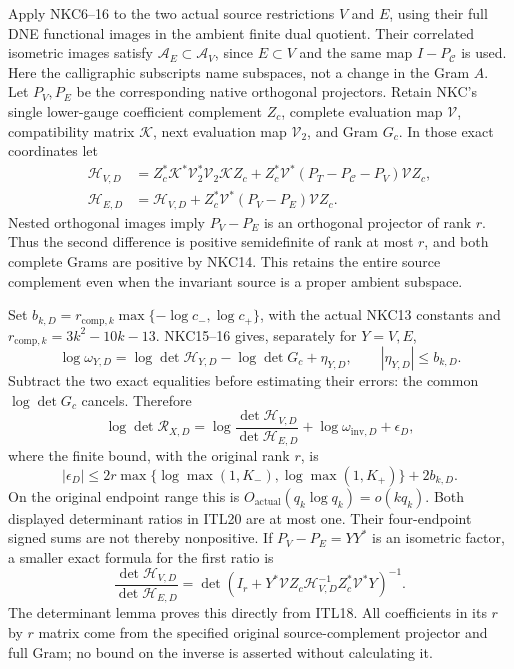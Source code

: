 \documentclass[11pt,a4paper]{article}
\begin{document}
Apply NKC6--16 to the two actual source restrictions $V$ and
$E$, using their full DNE functional images in the ambient
finite dual quotient. Their correlated isometric images
satisfy $\mathcal A_E\subset\mathcal A_V$, since $E\subset V$
and the same map $I-P_{\mathcal C}$ is used. Here the calligraphic
subscripts name subspaces, not a change in the Gram $A$.
Let $P_V,P_E$ be the corresponding native orthogonal projectors.
Retain NKC's single lower-gauge coefficient complement $Z_c$,
complete evaluation map $\mathcal V$, compatibility matrix
$\mathcal K$, next evaluation map $\mathcal V_2$, and Gram $G_c$.
In those exact coordinates let
\[
 \begin{split}
 \mathcal H_{V,D}&=Z_c^*\mathcal K^*\mathcal V_2^*\mathcal V_2
              \mathcal KZ_c+Z_c^*\mathcal V^*
                      (P_T-P_{\mathcal C}-P_V)\mathcal VZ_c,\\
 \mathcal H_{E,D}&=\mathcal H_{V,D}
                  +Z_c^*\mathcal V^*(P_V-P_E)\mathcal VZ_c .
                                                        \end{split} \tag{ITL18}
\]
Nested orthogonal images imply $P_V-P_E$ is an orthogonal
projector of rank $r$. Thus the second difference is positive
semidefinite of rank at most $r$, and both complete Grams are
positive by NKC14. This retains the entire source complement
even when the invariant source is a proper ambient subspace.

Set $b_{k,D}=r_{\mathrm{comp},k}
\max\{-\log c_-,\log c_+\}$, with the actual NKC13 constants
and $r_{\mathrm{comp},k}=3k^2-10k-13$.
NKC15--16 gives, separately for $Y=V,E$,
\[
 \log\omega_{Y,D}
  =\log\det\mathcal H_{Y,D}-\log\det G_c+\eta_{Y,D},
                   \qquad |\eta_{Y,D}|\le b_{k,D}. \tag{ITL19}
\]
Subtract the two exact equalities before estimating their errors:
the common $\log\det G_c$ cancels. Therefore
\[
 \boxed{\quad
 \log\det\mathscr R_{X,D}
   =\log\frac{\det\mathcal H_{V,D}}{\det\mathcal H_{E,D}}
      +\log\omega_{\mathrm{inv},D}+\epsilon_D,
 \quad}
 \tag{ITL20}
\]
where the finite bound, with the original rank $r$, is
\[
 |\epsilon_D|\le 2r\max\{\log\max(1,K_-),\log\max(1,K_+)\}
                                  +2b_{k,D}.       \tag{ITL21}
\]
On the original endpoint range this is
$O_{\mathrm{actual}}(q_k\log q_k)=o(kq_k)$.
Both displayed determinant ratios in ITL20 are at most one.
Their four-endpoint signed sums are not thereby nonpositive.
If $P_V-P_E=YY^*$ is an isometric factor, a smaller exact
formula for the first ratio is
\[
 \frac{\det\mathcal H_{V,D}}{\det\mathcal H_{E,D}}
   =\det\!\left(I_r+
       Y^*\mathcal VZ_c\mathcal H_{V,D}^{-1}
                     Z_c^*\mathcal V^*Y\right)^{-1}.
                                                        \tag{ITL22}
\]
The determinant lemma proves this directly from ITL18.
All coefficients in its $r$ by $r$ matrix come from the
specified original source-complement projector and full Gram;
no bound on the inverse is asserted without calculating it.
\end{document}
